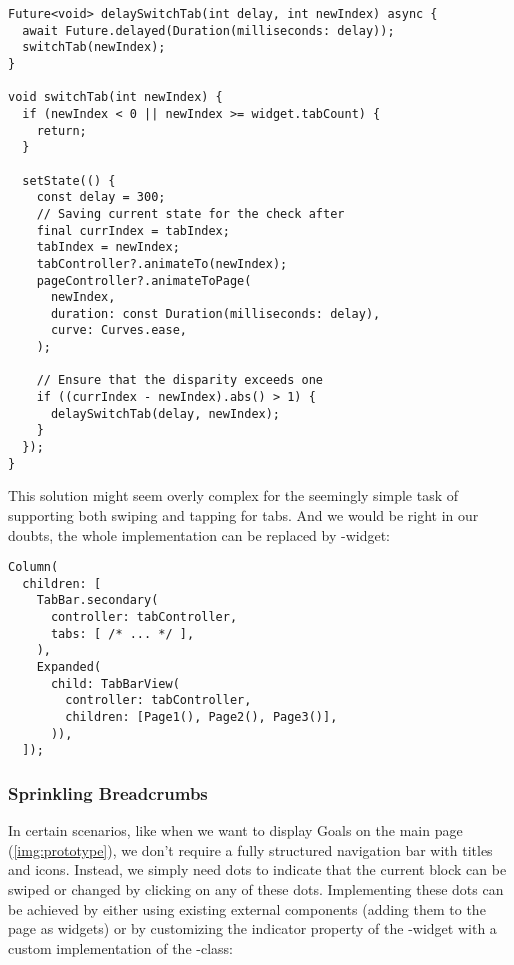 \begin{lstlisting}
Future<void> delaySwitchTab(int delay, int newIndex) async {
  await Future.delayed(Duration(milliseconds: delay));
  switchTab(newIndex);
}

void switchTab(int newIndex) {
  if (newIndex < 0 || newIndex >= widget.tabCount) {
    return;
  }

  setState(() {
    const delay = 300;
    // Saving current state for the check after 
    final currIndex = tabIndex;
    tabIndex = newIndex;
    tabController?.animateTo(newIndex);
    pageController?.animateToPage(
      newIndex,
      duration: const Duration(milliseconds: delay),
      curve: Curves.ease,
    );
  
    // Ensure that the disparity exceeds one
    if ((currIndex - newIndex).abs() > 1) {
      delaySwitchTab(delay, newIndex);
    }
  });
}
\end{lstlisting}

\noindent This solution might seem overly complex for the seemingly simple task of supporting both swiping and tapping 
for tabs. And we would be right in our doubts, the whole implementation can be replaced by -widget:

\begin{lstlisting}
Column(
  children: [
    TabBar.secondary(
      controller: tabController,
      tabs: [ /* ... */ ],
    ),
    Expanded(
      child: TabBarView(
        controller: tabController,
        children: [Page1(), Page2(), Page3()],
      )),
  ]);
\end{lstlisting}

\subsubsection{Sprinkling Breadcrumbs}

In certain scenarios, like when we want to display Goals on the main page (\cref{img:prototype}), we don't require a 
fully structured navigation bar with titles and icons. Instead, we simply need dots to indicate that the current block 
can be swiped or changed by clicking on any of these dots. Implementing these dots can be achieved by either using 
existing external components (adding them to the page as widgets) or by customizing the indicator property of the 
-widget with a custom implementation of the -class:

